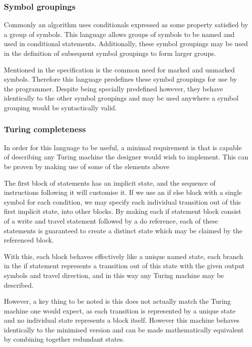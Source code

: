 \documentclass[11pt]{article}
\begin{document}
\subsubsection{Symbol groupings}

Commonly an algorithm uses conditionals expressed as some property satisfied by a group of symbols. This language allows groups of symbols to be named and used in conditional statements. Additionally, these symbol groupings may be used in the definition of subsequent symbol groupings to form larger groups.

Mentioned in the specification is the common need for marked and unmarked symbols. Therefore this language predefines these symbol groupings for use by the programmer. Despite being specially predefined however, they behave identically to the other symbol groupings and may be used anywhere a symbol grouping would be syntactically valid.

\subsubsection{Turing completeness}

In order for this language to be useful, a minimal requirement is that is capable of describing any Turing machine the designer would wish to implement. This can be proven by making use of some of the elements above

The first block of statements has an implicit state, and the sequence of instructions following it will customise it. If we use an if else block with a single symbol for each condition, we may specify each individual transition out of this first implicit state, into other blocks. By making each if statement block consist of a write and travel statement followed by a do reference, each of these statements is guaranteed to create a distinct state which may be claimed by the referenced block.

With this, each block behaves effectively like a unique named state, each branch in the if statement represents a transition out of this state with the given output symbols and travel direction, and in this way any Turing machine may be described.

However, a key thing to be noted is this does not actually match the Turing machine one would expect, as each transition is represented by a unique state and no individual state represents a block itself. However this machine behaves identically to the minimised version and can be made mathematically equivalent by combining together redundant states.
\end{document}
